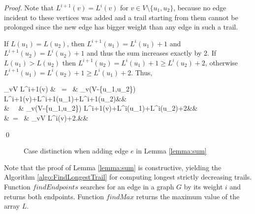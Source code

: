 \begin{isabellebody}
\begin{isamarkuptext}
\begin{proof}
Note that $L^{i+1}(v) = L^i(v)$ for $v\in V \setminus \{u_1,u_2\}$, because no edge incident to these vertices was added and
a trail starting from them cannot be prolonged since the new edge has bigger weight than any edge in such a 
trail.

If $L(u_1)=L(u_2)$, then $L^{i+1}(u_1) = L^i(u_1) + 1$ and $L^{i+1}(u_2) = L^i(u_2)+1$ and thus the sum increases exactly by 2. 
If $L(u_1)>L(u_2)$ then $L^{i+1}(u_2) = L^i(u_1) +1 \ge L^i(u_2)+2$, otherwise $L^{i+1}(u_1) = L^i(u_2) +1 \ge L^i(u_1)+2$. Thus, 

\begin{flalign*}
\sum_{v\in V} L^{i+1}(v) &~ = ~& \sum_{v\in (V-\{u_1,u_2\})} L^{i+1}(v)+L^{i+1}(u_1)+L^{i+1}(u_2)&&\\
&~\ge~ & \sum_{v\in (V-\{u_1,u_2\})} L^{i+1}(v)+L^i(u_1)+L^i(u_2)+2&&\\
&~=~ &  \sum_{v\in V} L^{i}(v)+2.&&
\end{flalign*}\qed
\end{proof}

\begin{figure}[h]
	\centering
	\caption{Case distinction when adding edge $e$ in Lemma \ref{lemma:sum}}\label{figure:cases}
\end{figure}
			

\noindent Note that the proof of Lemma \ref{lemma:sum} is constructive, yielding the Algorithm \ref{algo:FindLongestTrail} for computing
longest strictly decreasing trails. Function $findEndpoints$ searches for an edge in a graph $G$ by its weight $i$ and returns
both endpoints. Function $findMax$ returns the maximum value of the array $L$. 


\end{isamarkuptext}
\end{isabellebody}

